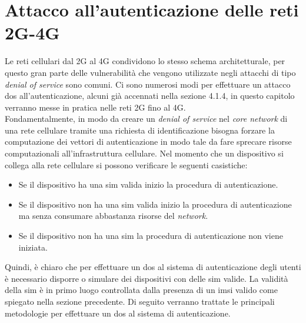 \chapter{Attacco all'autenticazione delle reti 2G-4G}
Le reti cellulari dal 2G al 4G condividono lo stesso schema architetturale, per questo gran parte delle vulnerabilità che vengono
utilizzate negli attacchi di tipo \textit{denial of service} sono comuni.
Ci sono numerosi modi per effettuare un attacco \gls{dos} all'autenticazione, alcuni già accennati nella sezione 4.1.4, in questo capitolo verranno messe in pratica 
nelle reti 2G fino al 4G.\\
Fondamentalmente, in modo da creare un \textit{denial of service} nel \textit{core network} di una rete cellulare tramite una richiesta di identificazione bisogna forzare
la computazione dei vettori di autenticazione in modo tale da fare sprecare risorse computazionali all'infrastruttura cellulare.
Nel momento che un dispositivo si collega alla rete cellulare si possono verificare le seguenti casistiche:
\begin{itemize}
    \item Se il dispositivo ha una \gls{sim} valida inizio la procedura di autenticazione.
    \item Se il dispositivo non ha una \gls{sim} valida inizio la procedura di autenticazione ma senza consumare abbastanza risorse del \textit{network}.
    \item Se il dispositivo non ha una \gls{sim} la procedura di autenticazione non viene iniziata.
\end{itemize}
Quindi, è chiaro che per effettuare un \gls{dos} al sistema di autenticazione degli utenti è necessario disporre o simulare dei dispositivi con delle \gls{sim} valide. La validità della \gls{sim} è 
in primo luogo controllata dalla presenza di un \gls{imsi} valido come spiegato nella sezione precedente.
Di seguito verranno trattate le principali metodologie per effettuare un \gls{dos} al sistema di autenticazione.

\clearpage


